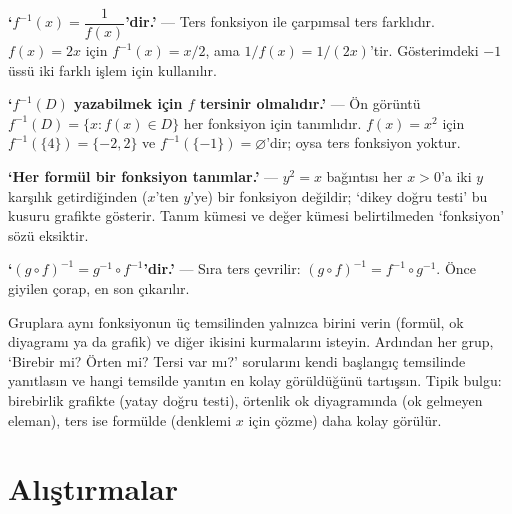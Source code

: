 \begin{yanilgi}
\textbf{‘$f^{-1}(x)=\dfrac1{f(x)}$’dir.’} — Ters fonksiyon ile çarpımsal ters farklıdır. $f(x)=2x$ için $f^{-1}(x)=x/2$, ama $1/f(x)=1/(2x)$’tir. Gösterimdeki $-1$ üssü iki farklı işlem için kullanılır.

\smallskip
\textbf{‘$f^{-1}(D)$ yazabilmek için $f$ tersinir olmalıdır.’} — Ön görüntü $f^{-1}(D)=\{x: f(x)\in D\}$ her fonksiyon için tanımlıdır. $f(x)=x^2$ için $f^{-1}(\{4\})=\{-2,2\}$ ve $f^{-1}(\{-1\})=\varnothing$’dir; oysa ters fonksiyon yoktur.

\smallskip
\textbf{‘Her formül bir fonksiyon tanımlar.’} — $y^2=x$ bağıntısı her $x>0$’a iki $y$ karşılık getirdiğinden ($x$’ten $y$’ye) bir fonksiyon değildir; ‘dikey doğru testi’ bu kusuru grafikte gösterir. Tanım kümesi ve değer kümesi belirtilmeden ‘fonksiyon’ sözü eksiktir.

\smallskip
\textbf{‘$(g\circ f)^{-1}=g^{-1}\circ f^{-1}$’dir.’} — Sıra ters çevrilir: $(g\circ f)^{-1}=f^{-1}\circ g^{-1}$. Önce giyilen çorap, en son çıkarılır.
\end{yanilgi}

\begin{sinif}
Gruplara aynı fonksiyonun üç temsilinden yalnızca birini verin (formül, ok diyagramı ya da grafik) ve diğer ikisini kurmalarını isteyin. Ardından her grup, ‘Birebir mi? Örten mi? Tersi var mı?’ sorularını kendi başlangıç temsilinde yanıtlasın ve hangi temsilde yanıtın en kolay görüldüğünü tartışsın. Tipik bulgu: birebirlik grafikte (yatay doğru testi), örtenlik ok diyagramında (ok gelmeyen eleman), ters ise formülde (denklemi $x$ için çözme) daha kolay görülür.
\end{sinif}

\section*{Alıştırmalar}





